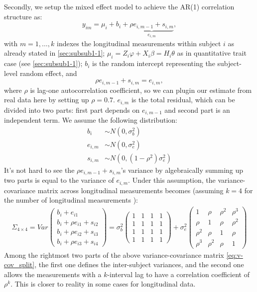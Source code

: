 \documentclass[12pt]{article}
\begin{document}
Secondly, we setup the mixed effect model to achieve the AR(1) correlation structure as:\\
\begin{equation}
y_{im} = \mu_{i} + b_i + \underbrace{ \rho e_{i,m-1} + s_{i,m} }_{ e_{i,m} }  ,
\label{eq:y_im_split}
\end{equation}
with $m = 1,\ldots,k$ indexes the longitudinal measurements within subject $i$ as already stated in \ref{sec:subsub1-1}; $\mu_{i} = Z_i \varphi + X_i \beta = H_i \theta$ as in quantitative trait case (see \ref{sec:subsub1-1}); $b_i$ is the random intercept representing the subject-level random effect, and
$$
\rho e_{i,m-1} + s_{i,m} = e_{i,m},
$$ 
where $\rho$ is lag-one autocorrelation coefficient, so we can plugin our estimate from real data here by setting up $\rho = 0.7$. $e_{i,m}$ is the total residual, which can be divided into two parts: first part depends on $e_{i,m-1}$ and second part is an independent term. We assume the following distribution:\\
\begin{align*}
b_i & \sim N(0,\sigma_b^2)\\
e_{i,m} & \sim  N(0, \sigma_e^2)\\
s_{i,m} & \sim  N(0, (1 - \rho^2) \sigma_e^2 )
\end{align*}
It's not hard to see the $\rho e_{i,m-1} + s_{i,m}$'s variance by algebraically summing up two parts is equal to the variance of $e_{i,m}$. Under this assumption, the variance-covariance matrix across longitudinal measurements becomes (assuming $k = 4$ for the number of longitudinal measurements ):
\begin{eqnarray}
\Sigma_{4\times 4} = Var 
\begin{pmatrix}
b_i + e_{i1}\\
b_i + \rho e_{i1} + s_{i2}\\
b_i + \rho e_{i2} + s_{i3}\\
b_i + \rho e_{i3} + s_{i4}
\end{pmatrix}
= \sigma_b^2
\begin{pmatrix}
1 & 1 & 1 & 1\\
1 & 1 & 1 & 1\\
1 & 1 & 1 & 1\\
1 & 1 & 1 & 1
\end{pmatrix}
+ \sigma_e^2 
\begin{pmatrix}
1 & \rho & \rho^2 & \rho^3 \\
\rho & 1 & \rho & \rho^2 \\
\rho^2 & \rho & 1 & \rho \\
\rho^3 & \rho^2 & \rho & 1
\end{pmatrix}
\label{eq:v-cov_split}
\end{eqnarray}
Among the rightmost two parts of the above variance-covariance matrix \eqref{eq:v-cov_split}, the first one defines the inter-subject variances, and the second one allows the measurements with a $k$-interval lag to have a correlation coefficient of $\rho ^ k$. This is closer to reality in some cases for longitudinal data.\\
\end{document}
